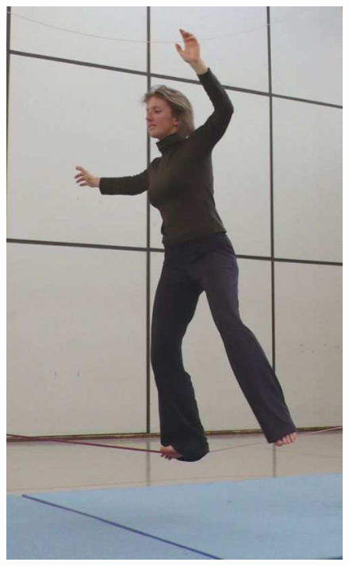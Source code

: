 \begin{figure}[htb]
\begin{minipage}[t]{0.20\linewidth}
		\includegraphics[width=1\linewidth]{Pictures/slacklineBasicOneFeet}
		\label{fig:slacklineBasicOneFeet}
	\end{minipage}
	\hfill
	\begin{minipage}[t]{0.33\linewidth}
		\centering

\end{minipage}
\end{figure}

